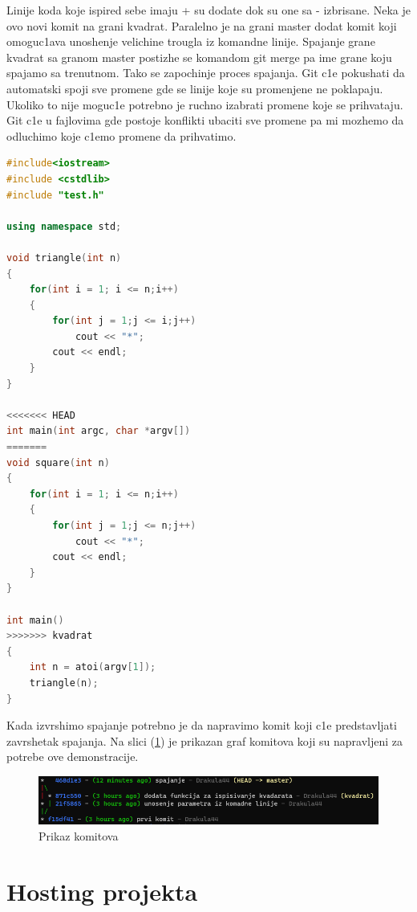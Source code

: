 \documentclass[a4paper,fleqn,12pt]{JMThesis}
\newcommand{\latin}{\fontencoding{T1}\selectfont}
\theoremstyle{plain}
\theoremstyle{definition}
\newcounter{cpp}
\begin{document}
Linije koda koje ispired sebe imaju {\latin +} su dodate dok su one sa {\latin -} izbrisane.
Neka je ovo novi komit na grani kvadrat. 
Paralelno je na grani {\latin master} dodat komit koji omoguc1ava unoshenje velichine trougla iz komandne linije. 
Spajanje grane {\latin kvadrat} sa granom {\latin master} postizhe se komandom {\latin git merge} pa ime grane koju spajamo sa trenutnom. 
Tako se zapochinje proces spajanja.
Git c1e pokushati da automat\-ski spoji sve promene gde se linije koje su promenjene ne poklapaju.
Ukoliko to nije moguc1e potrebno je ruchno izabrati promene koje se prihvataju. 
Git c1e u fajlovima gde postoje konflikti ubaciti sve promene pa mi mozhemo da odluchimo koje c1emo promene da prihvatimo.

{\latin
\begin{lstlisting}[language=C++,caption=izgled {\latin test.cpp} fajla koji treba ruchno da se spoji]
#include<iostream>
#include <cstdlib>
#include "test.h"

using namespace std;

void triangle(int n)
{
    for(int i = 1; i <= n;i++)
    {
        for(int j = 1;j <= i;j++)
            cout << "*";
        cout << endl;
    }
}

<<<<<<< HEAD
int main(int argc, char *argv[])
=======
void square(int n)
{
    for(int i = 1; i <= n;i++)
    {
        for(int j = 1;j <= n;j++)
            cout << "*";
        cout << endl;
    }
}

int main()
>>>>>>> kvadrat
{
    int n = atoi(argv[1]);
    triangle(n);
}
\end{lstlisting}
}

Kada izvrshimo spajanje potrebno je da napravimo komit koji c1e predstavljati zavrshetak spajanja. Na slici (\ref{fig:komitovi}) je prikazan graf komitova koji su napravljeni za potrebe ove demonstracije.

\begin{figure}[H]
    \centering
    \includegraphics[scale=0.7]{komitovi.png}
    \caption{Prikaz komitova}
    \label{fig:komitovi}
\end{figure}

\section{Hosting projekta}
\end{document}
